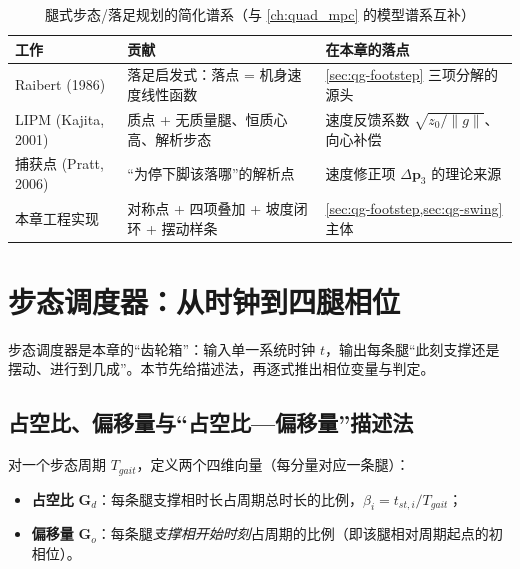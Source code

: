 \begin{table}[H]\centering\small
\caption{腿式步态/落足规划的简化谱系（与 \cref{ch:quad_mpc} 的模型谱系互补）}
\begin{tabular}{p{} p{} p{}}
\toprule
工作 & 贡献 & 在本章的落点 \\
\midrule
Raibert (1986)\cite{raibert1986legged} & 落足启发式：落点 = 机身速度线性函数 & \cref{sec:qg-footstep} 三项分解的源头 \\
LIPM (Kajita, 2001)\cite{kajita2001lipm} & 质点 + 无质量腿、恒质心高、解析步态 & 速度反馈系数 $\sqrt{z_0/\|g\|}$、向心补偿 \\
捕获点 (Pratt, 2006)\cite{pratt2006capture} & “为停下脚该落哪”的解析点 & 速度修正项 $\Delta\boldsymbol{p}_3$ 的理论来源 \\
本章工程实现\cite{yu2021quadruped} & 对称点 + 四项叠加 + 坡度闭环 + 摆动样条 & \cref{sec:qg-footstep,sec:qg-swing} 主体 \\
\bottomrule
\end{tabular}
\label{tab:qg-history}
\end{table}

\section{步态调度器：从时钟到四腿相位}
\label{sec:qg-scheduler}

步态调度器是本章的“齿轮箱”：输入单一系统时钟 $t$，输出每条腿“此刻支撑还是摆动、进行到几成”。本节先给描述法，再逐式推出相位变量与判定。

\subsection{占空比、偏移量与“占空比—偏移量”描述法}
\label{subsec:qg-duty}

\begin{definition}[占空比与偏移量]\label{def:qg-duty-offset}
对一个步态周期 $T_{gait}$，定义两个四维向量（每分量对应一条腿）：
\begin{itemize}
  \item \textbf{占空比} $\mathbf{G}_d$：每条腿支撑相时长占周期总时长的比例，$\beta_i=t_{st,i}/T_{gait}$；
  \item \textbf{偏移量} $\mathbf{G}_o$：每条腿\emph{支撑相开始时刻}占周期的比例（即该腿相对周期起点的初相位）。
\end{itemize}
\end{definition}


